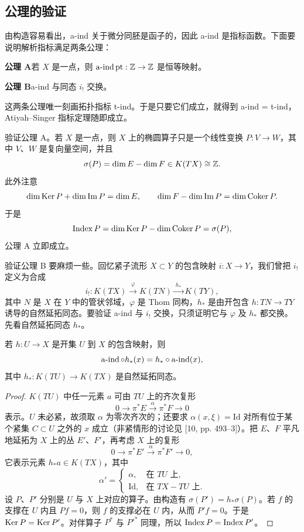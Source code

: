 \subsection{公理的验证}

由构造容易看出，a-ind 关于微分同胚是函子的，因此 a-ind 是指标函数。下面要说明解析指标满足两条公理：

\noindent\textbf{公理 A}\quad 若 $X$ 是一点，则 $\operatorname{a\text{-}ind}\mathrm{pt}:\mathbb{Z}\to\mathbb{Z}$ 是恒等映射。

\noindent\textbf{公理 B}\quad a-ind 与同态 $i_!$ 交换。

这两条公理唯一刻画拓扑指标 t-ind。于是只要它们成立，就得到 a-ind = t-ind，Atiyah–Singer 指标定理随即成立。

验证公理 A。若 $X$ 是一点，则 $X$ 上的椭圆算子只是一个线性变换 $P:V\to W$，其中 $V$、$W$ 是复向量空间，并且
\[
\sigma(P)=\dim E-\dim F\in K(TX)\cong\mathbb{Z} .
\]
此外注意
\[
\dim\operatorname{Ker} P+\dim\operatorname{Im}P=\dim E,\qquad
\dim F-\dim\operatorname{Im}P=\dim\operatorname{Coker} P .
\]
于是
\[
\operatorname{Index} P=\dim\operatorname{Ker} P-\dim\operatorname{Coker} P=\sigma(P),
\]
公理 A 立即成立。


验证公理 B 要麻烦一些。回忆紧子流形 $X\subset Y$ 的包含映射 $i:X\to Y$，我们曾把 $i_!$ 定义为合成
\[
i_!:K(TX)\xrightarrow{\ \varphi\ }K(TN)\xrightarrow{\ h_*\ }K(TY),
\]
其中 $N$ 是 $X$ 在 $Y$ 中的管状邻域，$\varphi$ 是 Thom 同构，$h_*$ 是由开包含 $h:TN\to TY$ 诱导的自然延拓同态。要验证 a-ind 与 $i_!$ 交换，只须证明它与 $\varphi$ 及 $h_*$ 都交换。先看自然延拓同态 $h_*$。

\begin{proposition}[切除]
若 $h:U\to X$ 是开集 $U$ 到 $X$ 的包含映射，则
\[
\operatorname{a\text{-}ind}\circ h_*(x)=h_*\circ\operatorname{a\text{-}ind}(x),
\]
其中 $h_*:K(TU)\to K(TX)$ 是自然延拓同态。
\end{proposition}

\begin{proof}
$K(TU)$ 中任一元素 $a$ 可由 $TU$ 上的齐次复形
\[
0\longrightarrow\pi^*E\xrightarrow{\ \alpha\ }\pi^*F\longrightarrow 0
\]
表示。$U$ 未必紧，故须取 $\alpha$ 为零次齐次的；还要求 $\alpha(x,\xi)=\mathrm{Id}$ 对所有位于某个紧集 $C\subset U$ 之外的 $x$ 成立（非紧情形的讨论见 [10, pp. 493–3]）。把 $E$、$F$ 平凡地延拓为 $X$ 上的丛 $E'$、$F'$，再考虑 $X$ 上的复形
\[
0\longrightarrow\pi^*E'\xrightarrow{\ \alpha\ }\pi^*F'\longrightarrow 0,
\]
它表示元素 $h_*a\in K(TX)$，其中
\[
\alpha'=
\begin{cases}
\alpha, & \text{在 }TU\text{ 上},\\
\mathrm{Id}, & \text{在 }TX-TU\text{ 上}.
\end{cases}
\]
设 $P$、$P'$ 分别是 $U$ 与 $X$ 上对应的算子。由构造有 $\sigma(P')=h_*\sigma(P)$。若 $f$ 的支撑在 $U$ 内且 $Pf=0$，则 $f$ 的支撑必在 $U$ 内，从而 $P'f=0$。于是 $\operatorname{Ker} P=\operatorname{Ker} P'$。对伴算子 $P^*$ 与 $P'^*$ 同理，所以 $\operatorname{Index} P=\operatorname{Index} P'$。
\end{proof}

